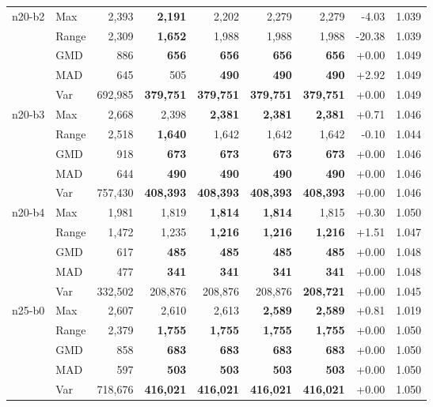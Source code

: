 \begin{small}
\begin{longtable}{llrrrrrrr}
n20-b2 & Max & 2,393 & \textbf{2,191} & 2,202 & 2,279 & 2,279 & -4.03 & 1.039 \\
 & Range & 2,309 & \textbf{1,652} & 1,988 & 1,988 & 1,988 & -20.38 & 1.039 \\
 & GMD & 886 & \textbf{656} & \textbf{656} & \textbf{656} & \textbf{656} & +0.00 & 1.049 \\
 & MAD & 645 & 505 & \textbf{490} & \textbf{490} & \textbf{490} & +2.92 & 1.049 \\
 & Var & 692,985 & \textbf{379,751} & \textbf{379,751} & \textbf{379,751} & \textbf{379,751} & +0.00 & 1.049 \\
n20-b3 & Max & 2,668 & 2,398 & \textbf{2,381} & \textbf{2,381} & \textbf{2,381} & +0.71 & 1.046 \\
 & Range & 2,518 & \textbf{1,640} & 1,642 & 1,642 & 1,642 & -0.10 & 1.044 \\
 & GMD & 918 & \textbf{673} & \textbf{673} & \textbf{673} & \textbf{673} & +0.00 & 1.046 \\
 & MAD & 644 & \textbf{490} & \textbf{490} & \textbf{490} & \textbf{490} & +0.00 & 1.046 \\
 & Var & 757,430 & \textbf{408,393} & \textbf{408,393} & \textbf{408,393} & \textbf{408,393} & +0.00 & 1.046 \\
n20-b4 & Max & 1,981 & 1,819 & \textbf{1,814} & \textbf{1,814} & 1,815 & +0.30 & 1.050 \\
 & Range & 1,472 & 1,235 & \textbf{1,216} & \textbf{1,216} & \textbf{1,216} & +1.51 & 1.047 \\
 & GMD & 617 & \textbf{485} & \textbf{485} & \textbf{485} & \textbf{485} & +0.00 & 1.048 \\
 & MAD & 477 & \textbf{341} & \textbf{341} & \textbf{341} & \textbf{341} & +0.00 & 1.048 \\
 & Var & 332,502 & 208,876 & 208,876 & 208,876 & \textbf{208,721} & +0.00 & 1.045 \\
n25-b0 & Max & 2,607 & 2,610 & 2,613 & \textbf{2,589} & \textbf{2,589} & +0.81 & 1.019 \\
 & Range & 2,379 & \textbf{1,755} & \textbf{1,755} & \textbf{1,755} & \textbf{1,755} & +0.00 & 1.050 \\
 & GMD & 858 & \textbf{683} & \textbf{683} & \textbf{683} & \textbf{683} & +0.00 & 1.050 \\
 & MAD & 597 & \textbf{503} & \textbf{503} & \textbf{503} & \textbf{503} & +0.00 & 1.050 \\
 & Var & 718,676 & \textbf{416,021} & \textbf{416,021} & \textbf{416,021} & \textbf{416,021} & +0.00 & 1.050 \\

\end{longtable}
\end{small}
